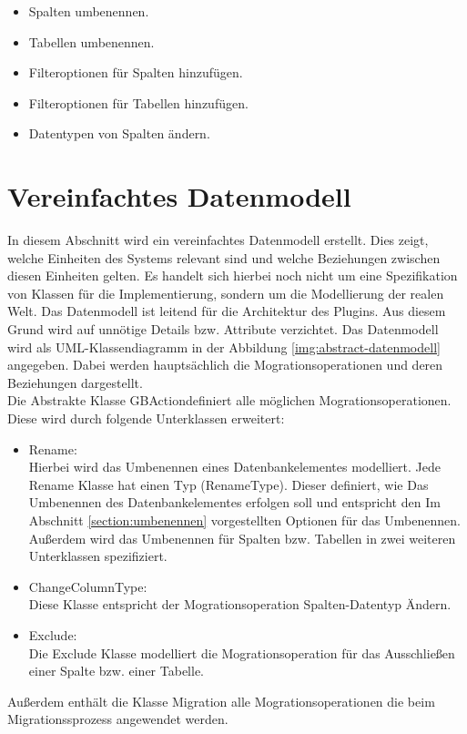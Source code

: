 \begin{itemize}
	\item Spalten  umbenennen.
	\item Tabellen umbenennen.
	\item Filteroptionen für Spalten hinzufügen.
	\item Filteroptionen für Tabellen hinzufügen.
	\item Datentypen von Spalten ändern.
\end{itemize}



\section{Vereinfachtes Datenmodell}
In diesem Abschnitt wird ein vereinfachtes Datenmodell erstellt. Dies zeigt, welche Einheiten des Systems relevant sind und welche Beziehungen zwischen diesen Einheiten gelten. Es handelt sich hierbei noch nicht um eine Spezifikation von Klassen für die Implementierung, sondern um
die Modellierung der realen Welt. Das Datenmodell ist leitend für die Architektur des Plugins. Aus diesem Grund wird auf unnötige Details bzw. Attribute verzichtet.
Das Datenmodell wird als UML-Klassendiagramm in der Abbildung \ref{img:abstract-datenmodell} angegeben. Dabei werden hauptsächlich die Mogrationsoperationen und deren Beziehungen dargestellt. \\
Die Abstrakte Klasse \glqq GBAction\grqq definiert alle möglichen Mogrationsoperationen. Diese wird durch folgende Unterklassen erweitert:
\begin{itemize}
	\item Rename: \\
	Hierbei wird das Umbenennen eines Datenbankelementes modelliert. Jede Rename Klasse hat einen Typ (RenameType). Dieser definiert, wie Das Umbenennen des Datenbankelementes erfolgen soll und entspricht den Im Abschnitt \ref{section:umbenennen} vorgestellten Optionen für das Umbenennen. Außerdem wird das Umbenennen für Spalten bzw. Tabellen in zwei weiteren Unterklassen spezifiziert.
	\item ChangeColumnType: \\
	Diese Klasse entspricht der Mogrationsoperation \glqq Spalten-Datentyp Ändern\grqq.  
	\item Exclude: \\
	Die Exclude Klasse modelliert die Mogrationsoperation für das Ausschließen einer Spalte bzw. einer Tabelle.
	\end{itemize}
Außerdem enthält die Klasse Migration alle Mogrationsoperationen die beim Migrationssprozess angewendet werden.
